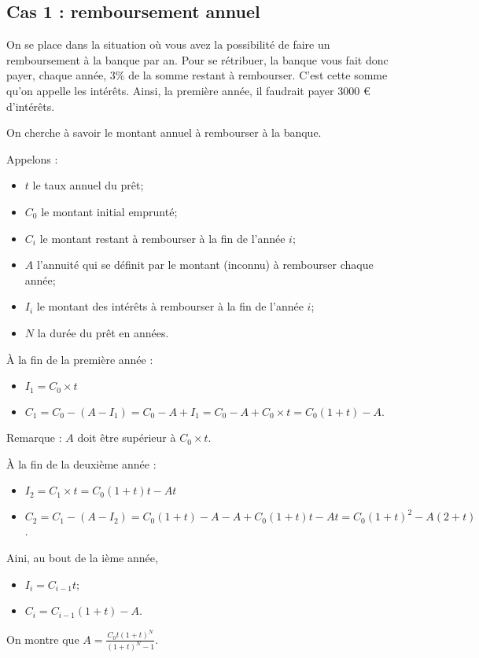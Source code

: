 \begin{multicols}{2}
\subsection*{Cas 1 : remboursement annuel}

On se place dans la situation où vous avez la possibilité de faire un remboursement à la banque par an. Pour se rétribuer, la banque vous fait donc payer, chaque année, 3\% de la somme restant à rembourser. C'est cette somme qu'on appelle les intérêts. Ainsi, la première année, il faudrait payer 3000 € d'intérêts.

On cherche à savoir le montant annuel à rembourser à la banque. 

Appelons :
\begin{itemize}
\item $t$ le taux annuel du prêt;
\item $C_0$ le montant initial emprunté; 
\item $C_i$ le montant restant à rembourser à la fin de l'année $i$;
\item $A$ l'annuité qui se définit par le montant (inconnu) à rembourser chaque année;
\item $I_i$ le montant des intérêts à rembourser à la fin de l'année $i$;
\item $N$ la durée du prêt en années. 
\end{itemize}

À la fin de la première année :
\begin{itemize}
\item $I_1 = C_0\times t$
\item $C_1 = C_0 - (A-I_1) = C_0 -A + I_1 = C_0 -A + C_0 \times t  = C_0(1+t)-A $.
 \end{itemize}
Remarque : $A$ doit être supérieur à $C_0\times t$.

À la fin de la deuxième année :
\begin{itemize}
\item $I_2 = C_1\times t = C_0(1+t)t-At$
\item $C_2 = C_1 - (A-I_2) = C_0(1+t)-A - A +C_0(1+t)t-At =C_0(1+t)^2 -A(2+t)$.
 \end{itemize}
Aini, au bout de la ième année, 
\begin{itemize}
\item $I_i = C_{i-1} t$;
\item $C_i = C_{i-1}(1+t)-A$.
 \end{itemize}
On montre que $A=\frac{C_0 t (1+t)^N}{(1+t)^N -1}$.



\end{multicols}
